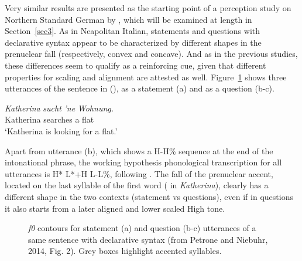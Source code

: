 Very similar results are presented as the starting point of a perception study on Northern Standard German by \cite{petrone2014intonation}, which will be examined at length in Section~\ref{sec3}. As in Neapolitan Italian, statements and questions with declarative syntax appear to be characterized by different shapes in the prenuclear fall (respectively, convex and concave). And as in the previous studies, these differences seem to qualify as a reinforcing cue, given that different properties for scaling and alignment are attested as well. Figure~\ref{fig211} shows three utterances of the sentence in (), as a statement (a) and as a question (b-c). 

\ea
\gll \textit{Katherina} \textit{sucht} \textit{'ne} \textit{Wohnung.}\\
Katherina searches a flat\\
\glt ‘Katherina is looking for a flat.’
\z

Apart from utterance (b), which shows a H-H\% sequence at the end of the intonational phrase, the working hypothesis phonological transcription for all utterances is H* L*+H L-L\%, following \citet{grice2002deutsche}. The fall of the prenuclear accent, located on the last syllable of the first word (\textipa{[na]} in \textit{Katherina}), clearly has a different shape in the two contexts (statement vs questions), even if in questions it also starts from a later aligned and lower scaled High tone.

\begin{figure}
\centering
{}
\caption{\textit{f0} contours for statement (a) and question (b-c) utterances of a same sentence with declarative syntax (from Petrone and Niebuhr, 2014, Fig. 2). Grey boxes highlight accented syllables.}
\label{fig211}\end{figure}


